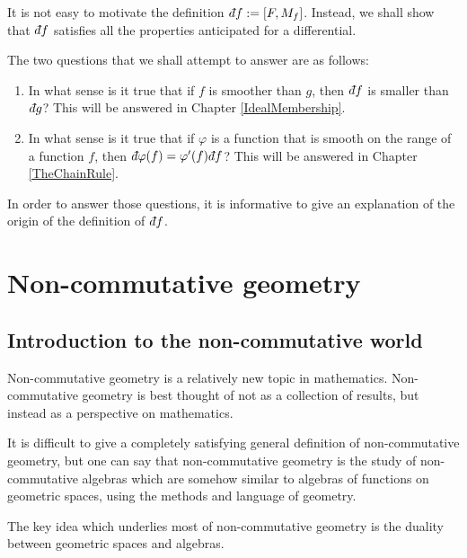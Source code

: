 It is not easy to motivate the definition $\qd f := [F,M_f]$. Instead,
we shall show that $\qd f$ satisfies all the properties
anticipated for a differential. 

The two questions that we shall attempt to answer are as follows:
\begin{enumerate}
    \item{} In what sense is it true that if $f$ is smoother than $g$, then $\qd f$
    is smaller than $\qd g$? This will be answered in Chapter \ref{IdealMembership}.
    \item{} In what sense is it true that if $\varphi$ is a function that is smooth
    on the range of a function $f$, then $\qd \varphi(f) = \varphi'(f)\qd f$? This
    will be answered in Chapter \ref{TheChainRule}.
\end{enumerate}

In order to answer those questions, it is informative to give an explanation
of the origin of the definition of $\qd f$. 

\section{Non-commutative geometry}

\subsection{Introduction to the non-commutative world}
Non-commutative geometry is a relatively new topic in mathematics. Non-commutative
geometry is best thought of not as a collection of results, but instead as a
perspective on mathematics. 

It is difficult to give a completely satisfying general definition of non-commutative geometry, but 
one can say that non-commutative geometry is the study of non-commutative algebras
which are somehow similar to algebras of functions on geometric spaces, using
the methods and language of geometry.

The key idea which underlies most of non-commutative geometry is the duality
between geometric spaces and algebras. 

